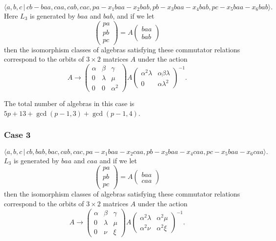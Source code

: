 \documentclass[10pt]{article}
\begin{document}
\begin{equation}
\langle
a,b,c\,|%
\,cb-baa,caa,cab,cac,pa-x_{1}baa-x_{2}bab,pb-x_{3}baa-x_{4}bab,pc-x_{5}baa-x_{6}bab\rangle .
\tag{7.758}
\end{equation}%
Here $L_{3}$ is generated by $baa$ and $bab$, and if we let 
\[
\left( 
\begin{array}{l}
pa \\ 
pb \\ 
pc%
\end{array}%
\right) =A\left( 
\begin{array}{l}
baa \\ 
bab%
\end{array}%
\right) 
\]%
then the isomorphism classes of algebras satisfying these commutator
relations correspond to the orbits of $3\times 2$ matrices $A$ under the
action 
\[
A\rightarrow \left( 
\begin{array}{lll}
\alpha & \beta & \gamma \\ 
0 & \lambda & \mu \\ 
0 & 0 & \alpha ^{2}%
\end{array}%
\right) A\left( 
\begin{array}{ll}
\alpha ^{2}\lambda & \alpha \beta \lambda \\ 
0 & \alpha \lambda ^{2}%
\end{array}%
\right) ^{-1}. 
\]

The total number of algebras in this case is $5p+13+\gcd (p-1,3)+\gcd
(p-1,4) $.

\subsubsection{Case 3}

\begin{equation}
\langle
a,b,c\,|%
\,cb,bab,bac,cab,cac,pa-x_{1}baa-x_{2}caa,pb-x_{3}baa-x_{4}caa,pc-x_{5}baa-x_{6}caa\rangle .
\tag{7.759}
\end{equation}%
$L_{3}$ is generated by $baa$ and $caa$ and if we let 
\[
\left( 
\begin{array}{l}
pa \\ 
pb \\ 
pc%
\end{array}%
\right) =A\left( 
\begin{array}{l}
baa \\ 
caa%
\end{array}%
\right) 
\]%
then the isomorphism classes of algebras satisfying these commutator
relations correspond to the orbits of $3\times 2$ matrices $A$ under the
action 
\[
A\rightarrow \left( 
\begin{array}{lll}
\alpha & \beta & \gamma \\ 
0 & \lambda & \mu \\ 
0 & \nu & \xi%
\end{array}%
\right) A\left( 
\begin{array}{ll}
\alpha ^{2}\lambda & \alpha ^{2}\mu \\ 
\alpha ^{2}\nu & \alpha ^{2}\xi%
\end{array}%
\right) ^{-1}. 
\]%
$\allowbreak $
\end{document}
